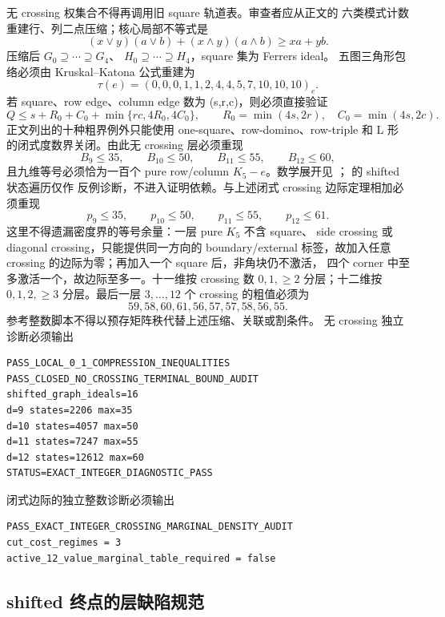无 crossing 权集合不得再调用旧 square 轨道表。审查者应从正文的
六类模式计数重建行、列二点压缩；核心局部不等式是
\[
(x\vee y)(a\vee b)+(x\wedge y)(a\wedge b)\ge xa+yb.
\]
压缩后 \(G_0\supseteq\cdots\supseteq G_4\)、
\(H_0\supseteq\cdots\supseteq H_4\)，square 集为 Ferrers ideal。
五图三角形包络必须由 Kruskal--Katona 公式重建为
\[
\tau(e)=(0,0,0,1,1,2,4,4,5,7,10,10,10)_e.
\]
若 square、row edge、column edge 数为 (s,r,c)，则必须直接验证
\[
Q\le s+R_0+C_0+\min\{rc,4R_0,4C_0\},\qquad
R_0=\min(4s,2r),\quad C_0=\min(4s,2c).
\]
正文列出的十种粗界例外只能使用 one-square、row-domino、row-triple
和 L 形的闭式度数界关闭。由此无 crossing 层必须重现
\[
B_9\le35,\qquad B_{10}\le50,\qquad
B_{11}\le55,\qquad B_{12}\le60,
\]
且九维等号必须恰为一百个 pure row/column \(K_5-e\)。数学展开见
；
 的 shifted 状态遍历仅作
反例诊断，不进入证明依赖。与上述闭式 crossing 边际定理相加必须重现
\[
p_9\le35,\qquad p_{10}\le50,\qquad p_{11}\le55,\qquad p_{12}\le61.
\]
这里不得遗漏密度界的等号余量：一层 pure \(K_5\) 不含 square、
side crossing 或 diagonal crossing，只能提供同一方向的
boundary/external 标签，故加入任意 crossing 的边际为零；再加入一个
square 后，非角块仍不激活，
四个 corner 中至多激活一个，故边际至多一。十一维按 crossing 数
\(0,1,\ge2\) 分层；十二维按 \(0,1,2,\ge3\) 分层。最后一层
\(3,\ldots,12\) 个 crossing 的粗值必须为
\[
59,58,60,61,56,57,57,58,56,55.
\]
参考整数脚本不得以预存矩阵秩代替上述压缩、关联或割条件。
无 crossing 独立诊断必须输出
\begin{verbatim}
PASS_LOCAL_0_1_COMPRESSION_INEQUALITIES
PASS_CLOSED_NO_CROSSING_TERMINAL_BOUND_AUDIT
shifted_graph_ideals=16
d=9 states=2206 max=35
d=10 states=4057 max=50
d=11 states=7247 max=55
d=12 states=12612 max=60
STATUS=EXACT_INTEGER_DIAGNOSTIC_PASS
\end{verbatim}
闭式边际的独立整数诊断必须输出
\begin{verbatim}
PASS_EXACT_INTEGER_CROSSING_MARGINAL_DENSITY_AUDIT
cut_cost_regimes = 3
active_12_value_marginal_table_required = false
\end{verbatim}

\subsection{shifted 终点的层缺陷规范}

